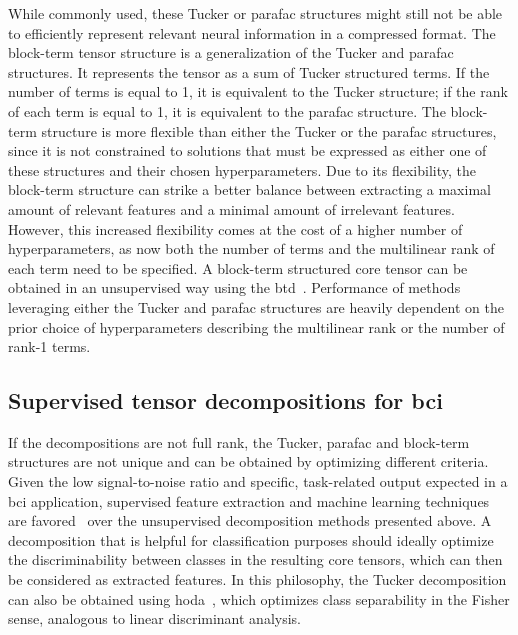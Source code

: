 \documentclass[twocolumn]{article}
\begin{document}
While commonly used, these Tucker or \ac{parafac} structures might still not be able to
efficiently represent relevant neural information in a compressed format.
The block-term tensor structure is a generalization of the Tucker and
\ac{parafac} structures.
It represents the tensor as a sum of Tucker structured terms.
If the number of terms is equal to 1, it is equivalent to the Tucker structure;
if the rank of each term is equal to 1, it is equivalent to the \ac{parafac}
structure.
The block-term structure is more flexible than either the Tucker or the \ac{parafac}
structures, since it is not constrained to solutions that must be expressed as
either one of these structures and their chosen hyperparameters.
Due to its flexibility, the block-term structure can strike a better
balance between extracting a maximal amount of relevant features and a minimal
amount of irrelevant features.
However, this increased flexibility comes at the cost of a higher number of
hyperparameters, as now both the number of terms and the multilinear rank of
each term need to be specified.
A block-term structured core tensor can be obtained in an unsupervised way using
the \ac{btd}~\cite{DeLathauwer2008,DeLathauwer2008a,DeLathauwer2008b,Rontogiannis2021}.
Performance of methods leveraging either the Tucker and \ac{parafac} structures are
heavily dependent on the prior choice of hyperparameters describing
the multilinear rank or the number of rank-1 terms.

\subsection{Supervised tensor decompositions for \ac{bci}}

If the decompositions are not full rank, the Tucker, \ac{parafac} and block-term
structures are not unique and can be obtained by optimizing different criteria.
Given the low signal-to-noise ratio and specific, task-related output expected
in a \ac{bci} application, supervised feature extraction and machine learning techniques are
favored~\cite{Lotte2018} over the unsupervised decomposition methods presented
above.
A decomposition that is helpful for classification purposes should ideally optimize
the discriminability between classes in the resulting core tensors, which can
then be considered as extracted features.
In this philosophy, the Tucker decomposition can also be obtained
using \ac{hoda}~\cite{Yan2005,Phan2010,Froelich2018}, which optimizes class
separability in the Fisher sense, analogous to linear discriminant analysis.
\end{document}
